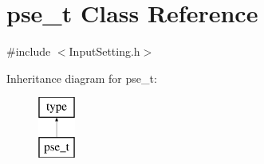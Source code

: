 \hypertarget{classpse__t}{\section{pse\-\_\-t Class Reference}
\label{classpse__t}
}


{\ttfamily \#include $<$Input\-Setting.\-h$>$}

Inheritance diagram for pse\-\_\-t\-:\begin{figure}[H]
\begin{center}
\leavevmode
\includegraphics[height=2.000000cm]{classpse__t}
\end{center}
\end{figure}
